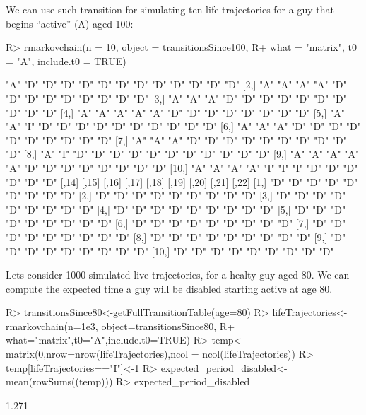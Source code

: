 \documentclass[
  nojss]{jss}
\begin{document}
We can use such transition for simulating ten life trajectories for a guy that begins ``active'' (A) aged 100:

\begin{CodeChunk}

\begin{CodeInput}
R> rmarkovchain(n = 10, object = transitionsSince100,
R+              what = "matrix", t0 = "A", include.t0 = TRUE)
\end{CodeInput}

\begin{CodeOutput}
      [,1] [,2] [,3] [,4] [,5] [,6] [,7] [,8] [,9] [,10] [,11] [,12] [,13]
 [1,] "A"  "D"  "D"  "D"  "D"  "D"  "D"  "D"  "D"  "D"   "D"   "D"   "D"  
 [2,] "A"  "A"  "A"  "A"  "D"  "D"  "D"  "D"  "D"  "D"   "D"   "D"   "D"  
 [3,] "A"  "A"  "A"  "D"  "D"  "D"  "D"  "D"  "D"  "D"   "D"   "D"   "D"  
 [4,] "A"  "A"  "A"  "A"  "A"  "D"  "D"  "D"  "D"  "D"   "D"   "D"   "D"  
 [5,] "A"  "A"  "I"  "D"  "D"  "D"  "D"  "D"  "D"  "D"   "D"   "D"   "D"  
 [6,] "A"  "A"  "A"  "D"  "D"  "D"  "D"  "D"  "D"  "D"   "D"   "D"   "D"  
 [7,] "A"  "A"  "A"  "D"  "D"  "D"  "D"  "D"  "D"  "D"   "D"   "D"   "D"  
 [8,] "A"  "I"  "D"  "D"  "D"  "D"  "D"  "D"  "D"  "D"   "D"   "D"   "D"  
 [9,] "A"  "A"  "A"  "A"  "A"  "D"  "D"  "D"  "D"  "D"   "D"   "D"   "D"  
[10,] "A"  "A"  "A"  "A"  "I"  "I"  "I"  "D"  "D"  "D"   "D"   "D"   "D"  
      [,14] [,15] [,16] [,17] [,18] [,19] [,20] [,21] [,22]
 [1,] "D"   "D"   "D"   "D"   "D"   "D"   "D"   "D"   "D"  
 [2,] "D"   "D"   "D"   "D"   "D"   "D"   "D"   "D"   "D"  
 [3,] "D"   "D"   "D"   "D"   "D"   "D"   "D"   "D"   "D"  
 [4,] "D"   "D"   "D"   "D"   "D"   "D"   "D"   "D"   "D"  
 [5,] "D"   "D"   "D"   "D"   "D"   "D"   "D"   "D"   "D"  
 [6,] "D"   "D"   "D"   "D"   "D"   "D"   "D"   "D"   "D"  
 [7,] "D"   "D"   "D"   "D"   "D"   "D"   "D"   "D"   "D"  
 [8,] "D"   "D"   "D"   "D"   "D"   "D"   "D"   "D"   "D"  
 [9,] "D"   "D"   "D"   "D"   "D"   "D"   "D"   "D"   "D"  
[10,] "D"   "D"   "D"   "D"   "D"   "D"   "D"   "D"   "D"  
\end{CodeOutput}
\end{CodeChunk}

Lets consider 1000 simulated live trajectories, for a healty guy aged 80. We can compute the expected time a guy will be disabled starting active at age 80.

\begin{CodeChunk}

\begin{CodeInput}
R> transitionsSince80<-getFullTransitionTable(age=80)
R> lifeTrajectories<-rmarkovchain(n=1e3, object=transitionsSince80,
R+                                what="matrix",t0="A",include.t0=TRUE)
R> temp<-matrix(0,nrow=nrow(lifeTrajectories),ncol = ncol(lifeTrajectories))
R> temp[lifeTrajectories=="I"]<-1
R> expected_period_disabled<-mean(rowSums((temp)))
R> expected_period_disabled
\end{CodeInput}

\begin{CodeOutput}
[1] 1.271
\end{CodeOutput}
\end{CodeChunk}
\end{document}
